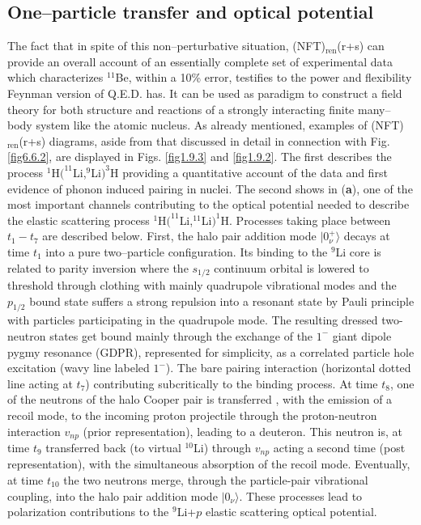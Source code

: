 \subsection{One--particle transfer and optical potential}
The fact that in spite of this non--perturbative situation, (NFT)$_{\text{ren}}$(r+s) can provide an overall account of an essentially complete set of experimental data which characterizes $^{11}$Be, within a 10\% error, testifies to the power and flexibility Feynman version of Q.E.D. has. It can be used as paradigm to construct a field theory for both structure and reactions of a strongly interacting finite many--body system like the atomic nucleus. As already mentioned, examples of (NFT)$_{\text{ren}}$(r+s) diagrams, aside from that discussed in detail in connection with Fig. \ref{fig6.6.2}, are displayed in Figs. \ref{fig1.9.3} and \ref{fig1.9.2}. The first describes the process  $^1$H$(^{11}$Li,$^9$Li$)^3$H providing a quantitative account of the data and first evidence of phonon induced pairing in nuclei. The second shows in (\textbf{a}), one of the most important channels contributing to the optical potential needed to describe the elastic scattering process $^1$H$(^{11}$Li,$^{11}$Li$)^1$H. Processes taking place  between $t_1-t_7$ are described below. First,  the halo pair addition mode $|0^+_{\nu}\rangle$ decays at time $t_1$ into a pure two--particle configuration. Its binding to the $^9$Li core  is related to parity inversion where the $s_{1/2}$ continuum orbital is  lowered to threshold  through clothing  with mainly quadrupole  vibrational modes and the $p_{1/2}$ bound state suffers a strong repulsion into a resonant  state by Pauli principle with particles participating  in the quadrupole mode. The resulting dressed two-neutron states get bound mainly through the exchange  of the $1^-$ giant dipole pygmy resonance (GDPR), represented for simplicity, as a correlated particle hole excitation (wavy line labeled $1^-$). The bare pairing interaction  (horizontal dotted
    	    	line acting at $t_7$) contributing subcritically to the binding process.
    	    	At time $t_8$, one of the neutrons of the halo Cooper  pair is transferred , with the emission of a recoil mode, to the incoming  proton  projectile through  the proton-neutron interaction $v_{np}$ (prior representation),  leading to a deuteron. This 
    	    	 neutron is, at time $t_9$ transferred  back (to virtual $^{10}$Li) through  $v_{np}$ acting a second time  (post representation), with the simultaneous  absorption of the recoil mode. Eventually, at  time $t_{10}$ the two neutrons merge, through  the particle-pair vibrational coupling, into  the halo pair addition mode $|0_{\nu}\rangle$. These processes lead to polarization contributions to the 
    	    	 $^9$Li+$p$ elastic scattering optical potential.
    	    	 

